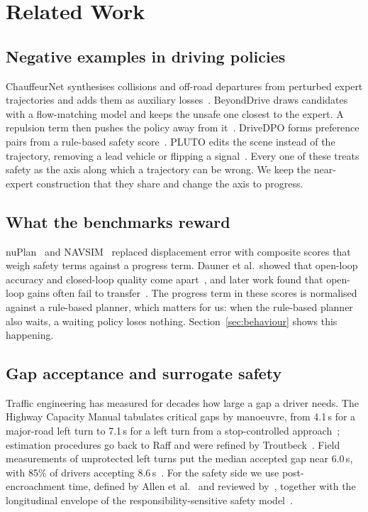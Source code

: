 \documentclass[conference]{IEEEtran}
\begin{document}
\section{Related Work}

\subsection{Negative examples in driving policies}
ChauffeurNet synthesises collisions and off-road departures from perturbed
expert trajectories and adds them as auxiliary
losses~\cite{chauffeurnet}. BeyondDrive draws candidates with a flow-matching
model and keeps the unsafe one closest to the expert. A repulsion term then
pushes the policy away from it~\cite{beyonddrive}. DriveDPO forms preference pairs from a rule-based safety
score~\cite{drivedpo}. PLUTO edits the scene instead of the trajectory, removing
a lead vehicle or flipping a signal~\cite{pluto}. Every one of these treats
safety as the axis along which a trajectory can be wrong. We keep the
near-expert construction that they share and change the axis to progress.

\subsection{What the benchmarks reward}
nuPlan~\cite{nuplan} and NAVSIM~\cite{navsim} replaced displacement error with
composite scores that weigh safety terms against a progress term. Dauner et al.\ showed that open-loop accuracy and closed-loop quality
come apart~\cite{parting}, and later work found that open-loop gains often fail
to transfer~\cite{holtz2026}. The progress term in these scores is normalised
against a rule-based planner, which matters for us: when the rule-based planner
also waits, a waiting policy loses nothing. Section~\ref{sec:behaviour} shows
this happening.

\subsection{Gap acceptance and surrogate safety}
Traffic engineering has measured for decades how large a gap a driver needs. The
Highway Capacity Manual tabulates critical gaps by manoeuvre, from 4.1\,s for a
major-road left turn to 7.1\,s for a left turn from a stop-controlled
approach~\cite{hcm6}; estimation procedures go back to Raff and were refined by
Troutbeck~\cite{troutbeck2016,brilon1999}. Field measurements of unprotected
left turns put the median accepted gap near 6.0\,s, with 85\% of drivers
accepting 8.6\,s~\cite{ragland2006}. For the safety side we use post-encroachment
time, defined by Allen et al.~\cite{allen1978} and reviewed
by~\cite{mahmud2017}, together with the longitudinal envelope of the
responsibility-sensitive safety model~\cite{rss}.
\end{document}

